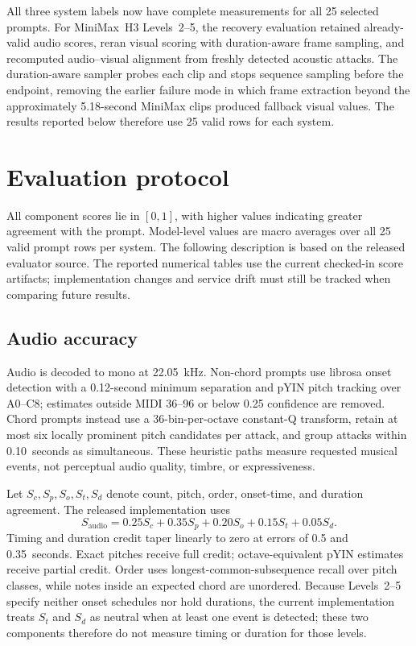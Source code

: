\documentclass{article}
\begin{document}
All three system labels now have complete measurements for all 25 selected prompts. For MiniMax~H3 Levels~2--5, the recovery evaluation retained already-valid audio scores, reran visual scoring with duration-aware frame sampling, and recomputed audio--visual alignment from freshly detected acoustic attacks. The duration-aware sampler probes each clip and stops sequence sampling before the endpoint, removing the earlier failure mode in which frame extraction beyond the approximately 5.18-second MiniMax clips produced fallback visual values. The results reported below therefore use 25 valid rows for each system.

\section{Evaluation protocol}
\label{sec:evaluation}

All component scores lie in $[0,1]$, with higher values indicating greater agreement with the prompt. Model-level values are macro averages over all 25 valid prompt rows per system. The following description is based on the released evaluator source. The reported numerical tables use the current checked-in score artifacts; implementation changes and service drift must still be tracked when comparing future results.

\subsection{Audio accuracy}

Audio is decoded to mono at 22.05~kHz. Non-chord prompts use librosa onset detection with a 0.12-second minimum separation and pYIN pitch tracking over A0--C8; estimates outside MIDI 36--96 or below 0.25 confidence are removed. Chord prompts instead use a 36-bin-per-octave constant-Q transform, retain at most six locally prominent pitch candidates per attack, and group attacks within 0.10~seconds as simultaneous. These heuristic paths measure requested musical events, not perceptual audio quality, timbre, or expressiveness.

Let $S_c,S_p,S_o,S_t,S_d$ denote count, pitch, order, onset-time, and duration agreement. The released implementation uses
\begin{equation}
  S_{\mathrm{audio}}=0.25S_c+0.35S_p+0.20S_o+0.15S_t+0.05S_d.
  \label{eq:audio-score}
\end{equation}
Timing and duration credit taper linearly to zero at errors of 0.5 and 0.35~seconds. Exact pitches receive full credit; octave-equivalent pYIN estimates receive partial credit. Order uses longest-common-subsequence recall over pitch classes, while notes inside an expected chord are unordered. Because Levels~2--5 specify neither onset schedules nor hold durations, the current implementation treats $S_t$ and $S_d$ as neutral when at least one event is detected; these two components therefore do not measure timing or duration for those levels.
\end{document}
